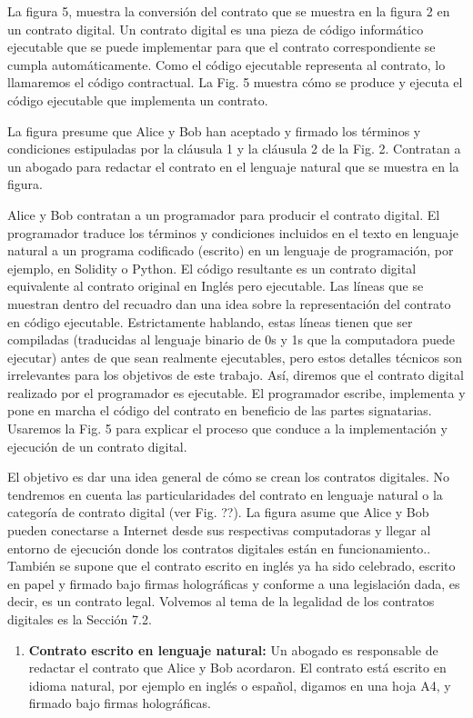 \documentclass[12pt]{report} %
\begin{document}
\begin{itemize}
La figura 5, muestra la conversión del contrato que se muestra en la figura 2 en un contrato digital. Un contrato digital es una pieza de código informático ejecutable que se puede implementar para que  el contrato correspondiente se cumpla automáticamente. Como el código ejecutable representa al contrato, lo llamaremos el código contractual. La Fig. 5 muestra cómo se produce y ejecuta el código ejecutable que implementa un contrato. 

La figura presume que Alice y Bob han aceptado y firmado los términos y condiciones estipuladas por la cláusula 1 y la cláusula 2 de la Fig. 2. Contratan a un abogado para redactar el contrato en el lenguaje natural que se muestra en la figura. 

Alice y Bob contratan a un programador para producir el contrato digital. El programador traduce los términos y condiciones incluidos en el texto en lenguaje natural a un programa codificado (escrito) en un lenguaje de programación, por ejemplo, en Solidity o Python. El código resultante es un contrato digital equivalente al contrato original en Inglés pero ejecutable. Las líneas que se muestran dentro del recuadro dan una idea sobre la representación del contrato en código ejecutable. Estrictamente hablando, estas líneas tienen que ser compiladas (traducidas al lenguaje binario de 0s y 1s que la computadora puede ejecutar) antes de que sean realmente ejecutables, pero estos detalles técnicos son irrelevantes para los objetivos de este trabajo. Así, diremos que el contrato digital realizado por el programador es ejecutable. El programador escribe, implementa y pone en marcha el código del contrato en beneficio de las partes signatarias. Usaremos la Fig. 5 para explicar el proceso que conduce a la implementación y ejecución de un contrato digital. 

El objetivo es dar una idea general de cómo se crean los contratos digitales. No tendremos en cuenta las particularidades del contrato en lenguaje natural o la categoría de contrato digital (ver Fig. ??). La figura asume que Alice y Bob pueden conectarse a Internet desde sus respectivas computadoras y llegar al entorno de ejecución donde los contratos digitales están en funcionamiento.. También se supone que el contrato escrito en inglés ya ha sido celebrado, escrito en papel y firmado bajo firmas holográficas y conforme a una legislación dada, es decir, es un contrato legal. Volvemos al tema de la legalidad de los contratos digitales es la Sección 7.2.

\begin{enumerate}
    \item \textbf{ Contrato escrito en lenguaje natural:} Un abogado es responsable de redactar el contrato que Alice y Bob acordaron. El contrato está escrito en idioma natural, por ejemplo en inglés o español, digamos en una hoja A4, y firmado bajo firmas holográficas.


\end{enumerate}
\end{itemize}
\end{document}
